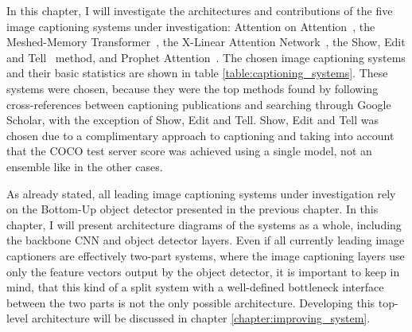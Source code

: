 \documentclass[english,twoside,openright]{HYgraduMLDS}
\begin{document}
In this chapter, I will investigate the architectures and contributions of the five image captioning systems under investigation: Attention on Attention~\cite{AoA}, the Meshed-Memory Transformer~\cite{M2}, the X-Linear Attention Network~\cite{XLinearAN}, the Show, Edit and Tell~\cite{ShowEdit} method, and Prophet Attention~\cite{Prophet}. The chosen image captioning systems and their basic statistics are shown in table \ref{table:captioning_systems}. These systems were chosen, because they were the top methods found by following cross-references between captioning publications and searching through Google Scholar, with the exception of Show, Edit and Tell. Show, Edit and Tell was chosen due to a complimentary approach to captioning and taking into account that the COCO test server score was achieved using a single model, not an ensemble like in the other cases. 

\begin{table}[h] 
\centering 
{}
\caption{Image captioning systems chosen for investigation.}
\label{table:captioning_systems}
\end{table}

As already stated, all leading image captioning systems under investigation rely on the Bottom-Up object detector presented in the previous chapter. In this chapter, I will present architecture diagrams of the systems as a whole, including the backbone CNN and object detector layers. Even if all currently leading image captioners are effectively two-part systems, where the image captioning layers use only the feature vectors output by the object detector, it is important to keep in mind, that this kind of a split system with a well-defined bottleneck interface between the two parts is not the only possible architecture. Developing this top-level architecture will be discussed in chapter \ref{chapter:improving_system}. 
\end{document}

